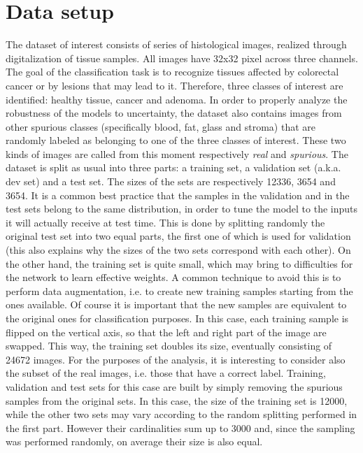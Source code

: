 \documentclass[11pt,twoside,a4paper]{article}
\begin{document}
\section{Data setup}
\label{sec:data}
The dataset of interest consists of series of histological images, realized through digitalization of tissue samples. All images have 32x32 pixel across three channels. The goal of the classification task is to recognize tissues affected by colorectal cancer or by lesions that may lead to it. Therefore, three classes of interest are identified: healthy tissue, cancer and adenoma. In order to properly analyze the robustness of the models to uncertainty, the dataset also contains images from other spurious classes (specifically blood, fat, glass and stroma) that are randomly labeled as belonging to one of the three classes of interest. These two kinds of images are called from this moment respectively \textit{real} and \textit{spurious}.\newline
The dataset is split as usual into three parts: a training set, a validation set (a.k.a. dev set) and a test set. The sizes of the sets are respectively 12336, 3654 and 3654. It is a common best practice that the samples in the validation and in the test sets belong to the same distribution, in order to tune the model to the inputs it will actually receive at test time. This is done by splitting randomly the original test set into two equal parts, the first one of which is used for validation (this also explains why the sizes of the two sets correspond with each other).\newline
On the other hand, the training set is quite small, which may bring to difficulties for the network to learn effective weights. A common technique to avoid this is to perform data augmentation, i.e. to create new training samples starting from the ones available. Of course it is important that the new samples are equivalent to the original ones for classification purposes. In this case, each training sample is flipped on the vertical axis, so that the left and right part of the image are swapped. This way, the training set doubles its size, eventually consisting of 24672 images.\newline
For the purposes of the analysis, it is interesting to consider also the subset of the real images, i.e. those that have a correct label.
Training, validation and test sets for this case are built by simply removing the spurious samples from the original sets. In this case, the size of the training set is 12000, while the other two sets may vary according to the random splitting performed in the first part. However their cardinalities sum up to 3000 and, since the sampling was performed randomly, on average their size is also equal.
\end{document}
